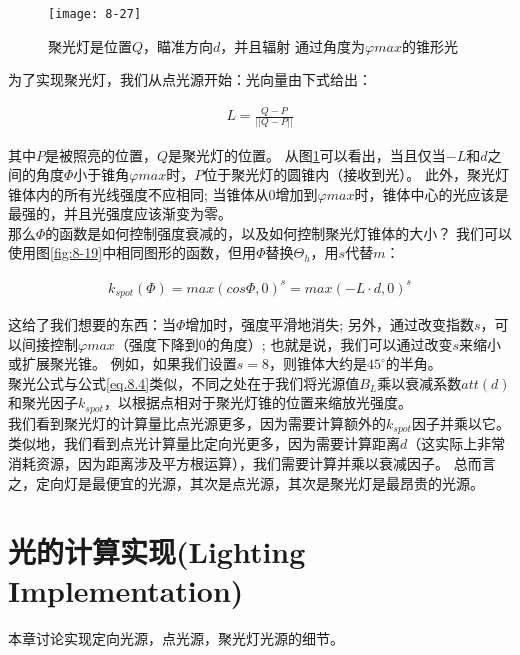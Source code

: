 \begin{figure}[h]
    \label{fig:8-27}
    \texttt{[image: 8-27]}
    \centering
    \caption{聚光灯是位置$Q$，瞄准方向$d$，并且辐射
通过角度为$\varphi max$的锥形光}
\end{figure}

\begin{flushleft}
为了实现聚光灯，我们从点光源开始：光向量由下式给出：\\
\end{flushleft}

\begin{align*}
L=\frac{Q-P}{||Q-P||}
\end{align*}

\begin{flushleft}
其中$P$是被照亮的位置，$Q$是聚光灯的位置。 从图\ref{fig:8-27}可以看出，当且仅当$-L$和$d$之间的角度$\Phi$小于锥角$\varphi max$时，$P$位于聚光灯的圆锥内（接收到光）。 此外，聚光灯锥体内的所有光线强度不应相同; 当锥体从0增加到$\varphi max$时，锥体中心的光应该是最强的，并且光强度应该渐变为零。\\
那么$\Phi$的函数是如何控制强度衰减的，以及如何控制聚光灯锥体的大小？ 我们可以使用图\ref{fig:8-19}中相同图形的函数，但用$\Phi$替换$\Theta_{h}$，用$s$代替$m$：\\
\end{flushleft}

\begin{align*}
k_{spot}(\Phi)=max(cos\Phi,0)^{s}=max(-L\cdot d,0)^{s}
\end{align*}

\begin{flushleft}
这给了我们想要的东西：当$\Phi$增加时，强度平滑地消失; 另外，通过改变指数$s$，可以间接控制$\varphi max$（强度下降到0的角度）; 也就是说，我们可以通过改变$s$来缩小或扩展聚光锥。 例如，如果我们设置$s = 8$，则锥体大约是$45^{\circ}$的半角。\\
聚光公式与公式\ref{eq.8.4}类似，不同之处在于我们将光源值$B_{L}$乘以衰减系数$att(d)$和聚光因子$k_{spot}$，以根据点相对于聚光灯锥的位置来缩放光强度。\\
我们看到聚光灯的计算量比点光源更多，因为需要计算额外的$k_{spot}$因子并乘以它。 类似地，我们看到点光计算量比定向光更多，因为需要计算距离$d$（这实际上非常消耗资源，因为距离涉及平方根运算），我们需要计算并乘以衰减因子。 总而言之，定向灯是最便宜的光源，其次是点光源，其次是聚光灯是最昂贵的光源。
\end{flushleft}

\section{光的计算实现(Lighting Implementation)}
\begin{flushleft}
本章讨论实现定向光源，点光源，聚光灯光源的细节。
\end{flushleft}

